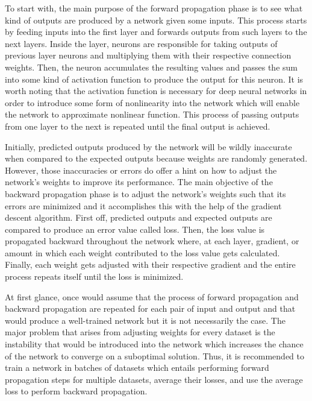 \documentclass{IEEEtran}
\begin{document}
        To start with, the main purpose of the forward propagation phase is to see what kind of outputs are produced by a network given some inputs. This process starts by feeding inputs into the first layer and forwards outputs from such layers to the next layers. Inside the layer, neurons are responsible for taking outputs of previous layer neurons and multiplying them with their respective connection weights. Then, the neuron accumulates the resulting values and passes the sum into some kind of activation function to produce the output for this neuron. It is worth noting that the activation function is necessary for deep neural networks in order to introduce some form of nonlinearity into the network which will enable the network to approximate nonlinear function\cite{luhaniwal_2020}. This process of passing outputs from one layer to the next is repeated until the final output is achieved.

        Initially, predicted outputs produced by the network will be wildly inaccurate when compared to the expected outputs because weights are randomly generated. However, those inaccuracies or errors do offer a hint on how to adjust the network’s weights to improve its performance. The main objective of the backward propagation phase is to adjust the network’s weights such that its errors are minimized and it accomplishes this with the help of the gradient descent algorithm. First off, predicted outputs and expected outputs are compared to produce an error value called loss. Then, the loss value is propagated backward throughout the network where, at each layer, gradient, or amount in which each weight contributed to the loss value gets calculated. Finally, each weight gets adjusted with their respective gradient and the entire process repeats itself until the loss is minimized\cite{kostadinov_2019}.

        At first glance, once would assume that the process of forward propagation and backward propagation are repeated for each pair of input and output and that would produce a well-trained network but it is not necessarily the case\cite{ruder2017overview}. The major problem that arises from adjusting weights for every dataset is the instability that would be introduced into the network which increases the chance of the network to converge on a suboptimal solution. Thus, it is recommended to train a network in batches of datasets which entails performing forward propagation steps for multiple datasets, average their losses, and use the average loss to perform backward propagation. 
\end{document}
